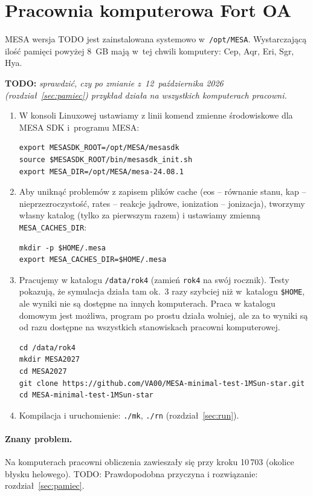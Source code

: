 \documentclass[11pt,a4paper]{article}
\begin{document}
\section{Pracownia komputerowa Fort OA}\label{sec:pracownia}

MESA wersja TODO jest zainstalowana systemowo w~\verb!/opt/MESA!. Wystarczającą ilość pamięci powyżej 8~GB mają
w~tej chwili komputery: Cep, Aqr, Eri, Sgr, Hya. 


\textbf{TODO:} \textit{sprawdzić, czy po zmianie z~12~października 2026
(rozdział~\ref{sec:pamiec}) przykład działa na wszystkich komputerach pracowni.}

\begin{enumerate}
\item W konsoli Linuxowej ustawiamy z linii komend zmienne środowiskowe dla MESA SDK i~programu MESA:
\begin{verbatim}
export MESASDK_ROOT=/opt/MESA/mesasdk
source $MESASDK_ROOT/bin/mesasdk_init.sh
export MESA_DIR=/opt/MESA/mesa-24.08.1
\end{verbatim}
\item Aby uniknąć problemów z zapisem plików cache (eos -- równanie stanu, kap --
  nieprzezroczystość, rates -- reakcje jądrowe, ionization -- jonizacja), tworzymy własny katalog (tylko za pierwszym razem)
  i ustawiamy zmienną \texttt{MESA\_CACHES\_DIR}:
\begin{verbatim}
mkdir -p $HOME/.mesa
export MESA_CACHES_DIR=$HOME/.mesa
\end{verbatim}
\item Pracujemy w katalogu \verb!/data/rok4! (zamień \texttt{rok4} na swój rocznik). Testy pokazują,
  że symulacja działa tam ok.~3 razy szybciej niż w~katalogu \verb#$HOME#, ale wyniki nie są
  dostępne na innych komputerach. Praca w katalogu domowym jest możliwa, program po prostu działa wolniej, ale za to wyniki są od razu dostępne na wszystkich stanowiskach pracowni komputerowej.   
\begin{verbatim}
cd /data/rok4
mkdir MESA2027
cd MESA2027
git clone https://github.com/VA00/MESA-minimal-test-1MSun-star.git
cd MESA-minimal-test-1MSun-star
\end{verbatim}
\item Kompilacja i uruchomienie: \verb!./mk!, \verb!./rn! (rozdział~\ref{sec:run}).
\end{enumerate}

\paragraph{Znany problem.} Na komputerach pracowni obliczenia zawieszały się przy kroku 10\,703
(okolice błysku helowego). TODO: Prawdopodobna przyczyna i rozwiązanie: rozdział~\ref{sec:pamiec}.
\end{document}
